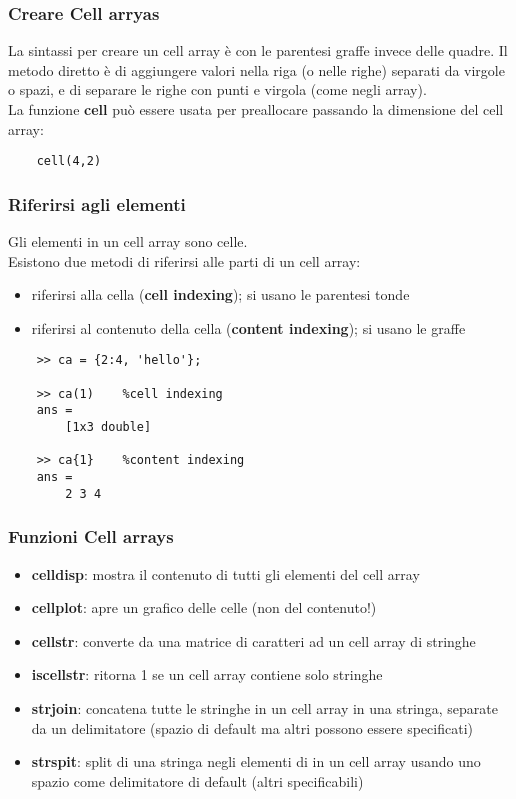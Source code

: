 \documentclass[a4paper, 10pt]{article}
\begin{document}
\subsubsection{Creare Cell arryas}
La sintassi per creare un cell array è con le parentesi graffe invece delle quadre. Il metodo diretto è di aggiungere valori nella riga (o nelle righe) separati da virgole o spazi, e di separare le righe con punti e virgola (come negli array).\\
La funzione \textbf{cell} può essere usata per preallocare passando la dimensione del cell array:
\begin{lstlisting}
	cell(4,2)
\end{lstlisting} 

\subsubsection{Riferirsi agli elementi}
Gli elementi in un cell array sono celle.\\
Esistono due metodi di riferirsi alle parti di un cell array:
\begin{itemize}
\item riferirsi alla cella (\textbf{cell indexing}); si usano le parentesi tonde 
\item riferirsi al contenuto della cella (\textbf{content indexing}); si usano le graffe
\end{itemize}
\begin{lstlisting}
	>> ca = {2:4, 'hello'};

	>> ca(1)	%cell indexing
	ans =
		[1x3 double]

	>> ca{1}	%content indexing
	ans =
		2 3 4
\end{lstlisting}

\subsubsection{Funzioni Cell arrays}
\begin{itemize}
\item \textbf{celldisp}: mostra il contenuto di tutti gli elementi del cell array
\item \textbf{cellplot}: apre un grafico delle celle (non del contenuto!)
\item \textbf{cellstr}: converte da una matrice di caratteri ad un cell array di stringhe
\item \textbf{iscellstr}: ritorna 1 se un cell array contiene solo stringhe
\item \textbf{strjoin}: concatena tutte le stringhe in un cell array in una stringa, separate da un delimitatore (spazio di default ma altri possono essere specificati)
\item \textbf{strspit}: split di una stringa negli elementi di in un cell array usando uno spazio come delimitatore di default (altri specificabili)
\end{itemize}
\end{document}
